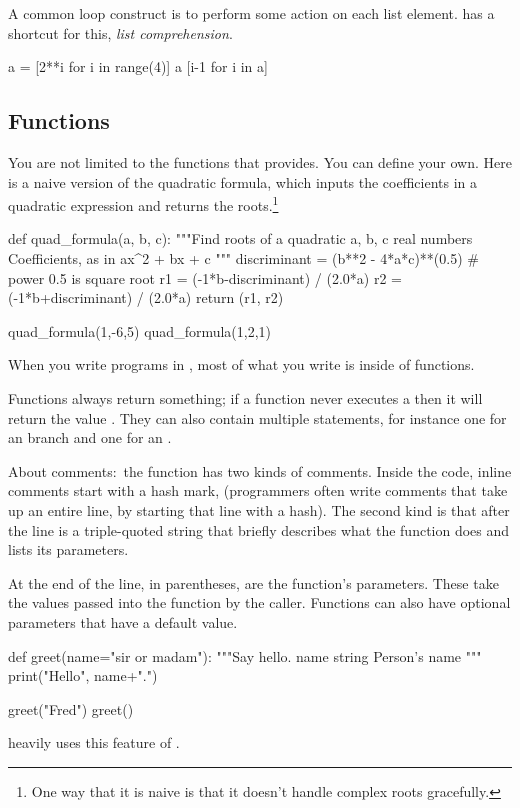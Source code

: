 A common loop construct is to perform some action
on each list element.
\python{} has a shortcut for this, \textit{list comprehension}.
\begin{pythonconsole}
a = [2**i for i in range(4)]
a
[i-1 for i in a]
\end{pythonconsole}



\subsection{Functions}
You are not limited to the functions that \python{}
provides.  
You can define your own.
Here is a naive version of the quadratic formula, which 
inputs the coefficients in a quadratic expression and returns the 
roots.\footnote{%
  One way that it is naive is that it doesn't handle complex roots gracefully.}
\begin{pythonconsole}
def quad_formula(a, b, c):
    """Find roots of a quadratic 
      a, b, c  real numbers Coefficients, as in ax^2 + bx + c
    """
    discriminant = (b**2 - 4*a*c)**(0.5)  # power 0.5 is square root
    r1 = (-1*b-discriminant) / (2.0*a)
    r2 = (-1*b+discriminant) / (2.0*a)
    return (r1, r2)

quad_formula(1,-6,5)
quad_formula(1,2,1)
\end{pythonconsole}
When you write programs in \python{}, most of what you write
is inside of functions. 

Functions always return something; 
if a function never executes a  then it will
return the value .
They can also contain multiple  statements, for instance 
one for an  branch and one for an .

About comments:~the  function has two kinds of 
comments.
Inside the code, inline comments start with a hash mark, \inlinecode{\#}
(programmers often write comments that take up an entire line, by starting 
that line with a hash). 
The second kind is that
after the  line is a triple-quoted string that
briefly describes
what the function does and lists its parameters.

At the end of the  line, in parentheses, are
the function's parameters. 
These take the values 
passed into the function by the caller.
Functions can also have optional parameters that have a default value.
\begin{pythonconsole}
def greet(name="sir or madam"):
    """Say hello.
      name  string  Person's name
    """
    print("Hello", name+".")

greet("Fred")
greet()
\end{pythonconsole}
\noindent
\Sage{}  heavily uses this feature of \python{}.







